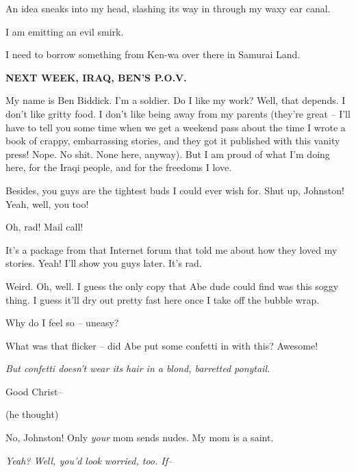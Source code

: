 An idea sneaks into my head, slashing its way in through my waxy
ear canal.



I am emitting an evil smirk.



I need to borrow something from Ken-wa over there in Samurai
Land.



{\bf NEXT WEEK, IRAQ, BEN'S P.O.V.}



My name is Ben Biddick. I'm a soldier. Do I like my work? Well,
that depends. I don't like gritty food. I don't like being away
from my parents (they're great -- I'll have to tell you some time
when we get a weekend pass about the time I wrote a book of crappy,
embarrassing stories, and they got it published with this vanity
press! Nope. No shit. None here, anyway). But I am proud of what
I'm doing here, for the Iraqi people, and for the freedoms I
love.



Besides, you guys are the tightest buds I could ever wish for. Shut
up, Johnston! Yeah, well, you too!



Oh, rad! Mail call!



It's a package from that Internet forum that told me about how they
loved my stories. Yeah! I'll show you guys later. It's rad.



Weird. Oh, well. I guess the only copy that Abe dude could find was
this soggy thing. I guess it'll dry out pretty fast here once I
take off the bubble wrap.



Why do I feel so -- uneasy?



What was that flicker -- did Abe put some confetti in with this?
Awesome!



{\em But confetti doesn't wear its hair in a blond, barretted
ponytail.



Good Christ--} (he thought)



No, Johnston! Only {\em your} mom sends nudes. My mom is a
saint.



{\em Yeah? Well, you'd look worried, too. If--}



